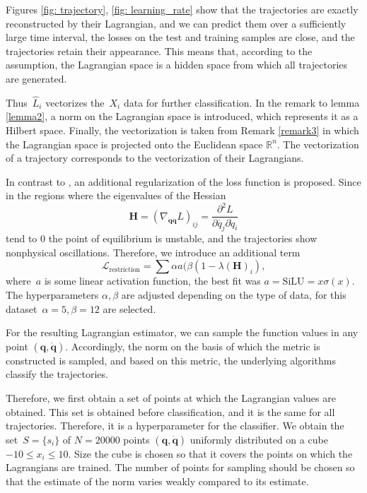 \documentclass[12pt]{paper}
\begin{document}
Figures \ref{fig: trajectory}, \ref{fig: learning_rate} show that the trajectories are exactly reconstructed by their Lagrangian, and we can predict them over a sufficiently large time interval, the losses on the test and training
samples are close, and the trajectories retain their appearance. This means that, according to the assumption, the Lagrangian space is a hidden space from which all trajectories are generated.

Thus~$\hat{L}_i$ vectorizes the~$X_i$ data for further classification. In the remark to lemma \ref{lemma2}, a norm
on the Lagrangian space is introduced, which represents it as a Hilbert space. Finally, the vectorization is taken from Remark \ref{remark3} in which the Lagrangian space is projected onto the Euclidean space $\mathbb{R}^n$. The vectorization of a trajectory corresponds to the vectorization of their
Lagrangians.

In contrast to \cite{article} , an additional regularization of the loss function is proposed.
Since in the regions where the eigenvalues of the Hessian
\[
\mathbf{H} = \left(\nabla_{\dot{\mathbf{q}}\dot{\mathbf{q}}} L\right)_{i j}=\frac{\partial^{2} L}{\partial \dot{q_{j}} \partial \dot{q}_{i}}
\]
tend to 0 the point of equilibrium is unstable, and the trajectories show nonphysical oscillations. Therefore, we introduce an additional term 
\[
\mathcal{L}_\text{restriction} =  \sum \alpha a(\beta(1 - \lambda(\mathbf{H})_i), 
\]
where~$a$ is some linear activation function, the best fit was %
$a = \text{SiLU} = x\sigma(x)$. The hyperparameters $\alpha, \beta$ are adjusted depending on the type of data, for this dataset~$\alpha = 5, \beta = 12$ are selected.

For the resulting Lagrangian estimator, we can sample the function values in any point $(\mathbf{q},\dot{\mathbf{q}})$. Accordingly, the norm on the basis of which the metric is constructed is sampled, and based on this metric, the underlying algorithms classify the trajectories.

Therefore, we first obtain a set of points at which the Lagrangian values are obtained. This
set is obtained before classification, and it is the same for all trajectories. Therefore, it is a
hyperparameter for the classifier. We obtain the set~$S = \{s_i\}$ of $N = 20000$ points $(\mathbf{q},\dot{\mathbf{q}})$ uniformly distributed on a cube~$-10 \le {x_i} \le 10$. Size
the cube is chosen so that it covers the points on which the Lagrangians are trained. The number of points for sampling should be chosen so that the estimate of the norm varies weakly
compared to its estimate.
\end{document}
